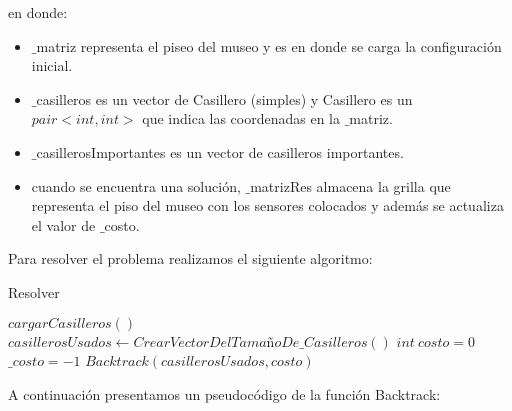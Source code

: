 en donde:

\begin{itemize}
	\item  $\_$matriz representa el piseo del museo y es en donde se carga la configuración inicial.
	\item $\_$casilleros es un vector de Casillero (simples) y Casillero es un $pair<int,int>$ que indica las coordenadas en la $\_$matriz.
	\item $\_$casillerosImportantes es un vector de casilleros importantes.
	\item cuando se encuentra una solución, $\_$matrizRes almacena la grilla que representa el piso del museo con los sensores colocados y además se actualiza el valor de $\_$costo. 
\end{itemize}

Para resolver el problema realizamos el siguiente algoritmo:

\begin{algorithm}[H]
\caption{Resolver}\label{Resolver}
\begin{algorithmic}[1]
	\State $cargarCasilleros()$ 
	\State $casillerosUsados\gets CrearVectorDelTamañoDe\_Casilleros()$ 
	\State $int \ costo=0$ 
	\State $\_costo=-1$ 
	\State $Backtrack(casillerosUsados,costo)$
\EndProcedure
\end{algorithmic}
\end{algorithm}

A continuación presentamos un pseudocódigo de la función Backtrack:

